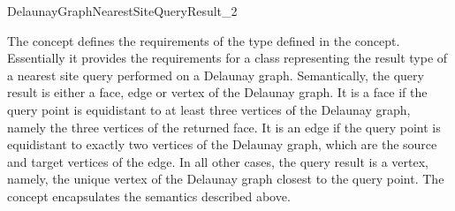 


\begin{ccRefConcept}{DelaunayGraphNearestSiteQueryResult_2}

\ccDefinition

The concept  defines the
requirements of the  type defined in the
concept. Essentially it provides the requirements for a class
representing the result type of a nearest site query performed on a
Delaunay graph. Semantically, the query result is either a face, edge or
vertex of the Delaunay graph. It is a face if the query point is
equidistant to at least three vertices of the Delaunay graph, namely
the three vertices of the returned face. It is an edge if the query
point is equidistant to exactly two vertices of the Delaunay graph,
which are the source and target vertices of the edge. In all other
cases, the query result is a vertex, namely, the unique vertex of the
Delaunay graph closest to the query point. The
 concept encapsulates the semantics
described above.

\ccRefines
{}\\
\\
\\

\ccTypes
{}
%
{}
\ccGlue
{}
\ccGlue
{}


\end{ccRefConcept}
